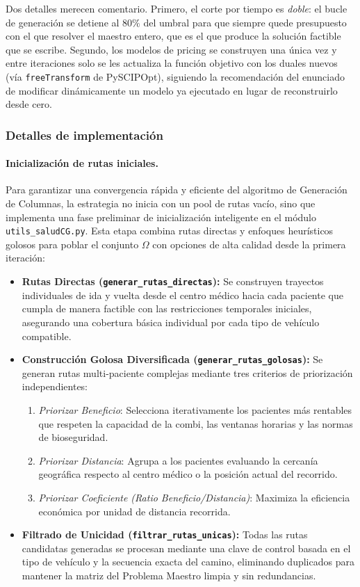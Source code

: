 \documentclass[12pt]{article}
\numberwithin{algorithm}{section}
\begin{document}
Dos detalles merecen comentario. Primero, el corte por tiempo es \emph{doble}: el bucle de
generación se detiene al $80\%$ del umbral para que siempre quede presupuesto con el que
resolver el maestro entero, que es el que produce la solución factible que se escribe. Segundo,
los modelos de pricing se construyen una única vez y entre iteraciones solo se les actualiza la
función objetivo con los duales nuevos (vía \texttt{freeTransform} de PySCIPOpt), siguiendo la
recomendación del enunciado de modificar dinámicamente un modelo ya ejecutado en lugar de
reconstruirlo desde cero.

\subsubsection{Detalles de implementación}

\paragraph{Inicialización de rutas iniciales.}
Para garantizar una convergencia rápida y eficiente del algoritmo de Generación de Columnas, la estrategia no inicia con un pool de rutas vacío, sino que implementa una fase preliminar de inicialización inteligente en el módulo \texttt{utils\_saludCG.py}. Esta etapa combina rutas directas y enfoques heurísticos golosos para poblar el conjunto $\Omega$ con opciones de alta calidad desde la primera iteración:

\begin{itemize}
    \item \textbf{Rutas Directas (\texttt{generar\_rutas\_directas}):} Se construyen trayectos individuales de ida y vuelta desde el centro médico hacia cada paciente que cumpla de manera factible con las restricciones temporales iniciales, asegurando una cobertura básica individual por cada tipo de vehículo compatible.
    \item \textbf{Construcción Golosa Diversificada (\texttt{generar\_rutas\_golosas}):} Se generan rutas multi-paciente complejas mediante tres criterios de priorización independientes:
    \begin{enumerate}
        \item \emph{Priorizar Beneficio}: Selecciona iterativamente los pacientes más rentables que respeten la capacidad de la combi, las ventanas horarias y las normas de bioseguridad.
        \item \emph{Priorizar Distancia}: Agrupa a los pacientes evaluando la cercanía geográfica respecto al centro médico o la posición actual del recorrido.
        \item \emph{Priorizar Coeficiente (Ratio Beneficio/Distancia)}: Maximiza la eficiencia económica por unidad de distancia recorrida.
    \end{enumerate}
    \item \textbf{Filtrado de Unicidad (\texttt{filtrar\_rutas\_unicas}):} Todas las rutas candidatas generadas se procesan mediante una clave de control basada en el tipo de vehículo y la secuencia exacta del camino, eliminando duplicados para mantener la matriz del Problema Maestro limpia y sin redundancias.
\end{itemize}
\end{document}
